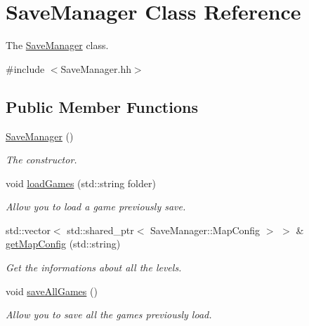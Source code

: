\hypertarget{classSaveManager}{}\section{Save\+Manager Class Reference}
\label{classSaveManager}


The \hyperlink{classSaveManager}{Save\+Manager} class.  




{\ttfamily \#include $<$Save\+Manager.\+hh$>$}

\subsection*{Public Member Functions}
\begin{DoxyCompactItemize}
\item 
\mbox{\label{classSaveManager_ab8bb791be648b9b91db44aa11f6e8e14}} 
\hyperlink{classSaveManager_ab8bb791be648b9b91db44aa11f6e8e14}{Save\+Manager} ()
\begin{DoxyCompactList}\small\item\em The constructor. \end{DoxyCompactList}\item 
void \hyperlink{classSaveManager_a96c17debbf9765e8c71e74010621585f}{load\+Games} (std\+::string folder)
\begin{DoxyCompactList}\small\item\em Allow you to load a game previously save. \end{DoxyCompactList}\item 
\mbox{\label{classSaveManager_a1c1a5baae9f5b60ff8b1dfe4b8a7525e}} 
std\+::vector$<$ std\+::shared\+\_\+ptr$<$ Save\+Manager\+::\+Map\+Config $>$ $>$ \& \hyperlink{classSaveManager_a1c1a5baae9f5b60ff8b1dfe4b8a7525e}{get\+Map\+Config} (std\+::string)
\begin{DoxyCompactList}\small\item\em Get the informations about all the levels. \end{DoxyCompactList}\item 
\mbox{\label{classSaveManager_abdc44f23de421540c0a201083eccc327}} 
void \hyperlink{classSaveManager_abdc44f23de421540c0a201083eccc327}{save\+All\+Games} ()
\begin{DoxyCompactList}\small\item\em Allow you to save all the games previously load. \end{DoxyCompactList}\item 

\end{DoxyCompactItemize}
